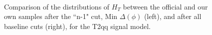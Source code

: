 \begin{figure}
        \centering
        \hspace{-1 cm}
        ~ %
        \caption{Comparison of the distributions of $H_T$ between the official and our own samples after the ``n-1" cut, Min $\Delta(\phi)$ (left), and after all baseline cuts (right), for the T2qq signal model.}\label{fig:animals}
\end{figure}        
        
